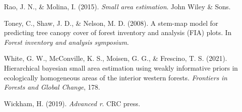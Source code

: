 \documentclass[12pt,twoside]{reedthesis}
\newlength{\cslhangindent}
\newenvironment{CSLReferences}[2] %
 {%
  \setlength{\parindent}{0pt}
  \ifodd #1 \everypar{\setlength{\hangindent}{\cslhangindent}}\ignorespaces\fi
  \ifnum #2 > 0
  \setlength{\parskip}{#2\baselineskip}
  \fi
 }%
 {}
\begin{document}
\begin{CSLReferences}{1}{0}
\leavevmode{}%
Rao, J. N., \& Molina, I. (2015). \emph{Small area estimation}. John Wiley \& Sons.

\leavevmode{}%
Toney, C., Shaw, J. D., \& Nelson, M. D. (2008). A stem-map model for predicting tree canopy cover of forest inventory and analysis (FIA) plots. In \emph{Forest inventory and analysis symposium}.

\leavevmode{}%
White, G. W., McConville, K. S., Moisen, G. G., \& Frescino, T. S. (2021). Hierarchical bayesian small area estimation using weakly informative priors in ecologically homogeneous areas of the interior western forests. \emph{Frontiers in Forests and Global Change}, 178.

\leavevmode{}%
Wickham, H. (2019). \emph{Advanced r}. CRC press.

\end{CSLReferences}

\end{document}
